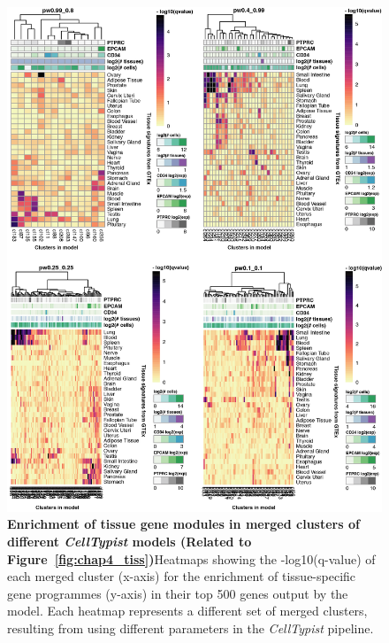 \begin{figure}[ht!] 
\centering
\includegraphics[scale=0.78]{Appendix3/Figs/appB_clmGSEA.png} %
\caption[Enrichment of tissue gene modules in merged clusters of different \textit{CellTypist} models]{\textbf{Enrichment of tissue gene modules in merged clusters of different \textit{CellTypist} models (Related to Figure~\ref{fig:chap4_tiss})}\newline Heatmaps showing the -log10(q-value) of each merged cluster (x-axis) for the enrichment of tissue-specific gene programmes (y-axis) in their top 500 genes output by the model. Each heatmap represents a different set of merged clusters, resulting from using different parameters in the \textit{CellTypist} pipeline.}
\label{fig:appB_clmGSEA}
\end{figure}


